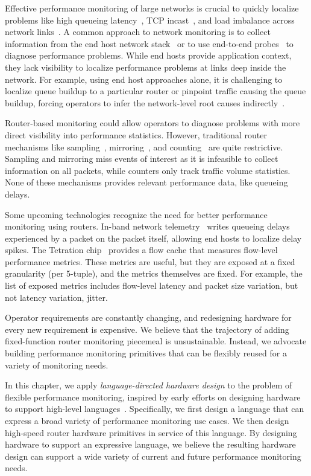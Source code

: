 Effective performance monitoring of large networks is crucial to quickly
localize problems like high queueing latency~\cite{int}, TCP
incast~\cite{tcpincast}, and load imbalance across network links~\cite{conga}.
A common approach to network monitoring is to collect information from the end
host network stack~\cite{minlan-snap, pathdump, trumpet} or to use end-to-end
probes~\cite{pingmesh} to diagnose performance problems.  While end hosts
provide application context, they lack visibility to localize performance
problems at links deep inside the network. For example, using end host
approaches alone, it is challenging to localize queue buildup to a particular
router or pinpoint traffic causing the queue buildup, forcing operators to
infer the network-level root causes indirectly~\cite{pingmesh}.

Router-based monitoring could allow operators to diagnose problems with more
direct visibility into performance statistics. However, traditional router
mechanisms like sampling~\cite{netflow, sflow}, mirroring~\cite{cisco-span,
netsight, everflow}, and counting~\cite{cormode, univmon} are quite
restrictive.  Sampling and mirroring miss events of interest as it is
infeasible to collect information on all packets, while counters only track
traffic volume statistics. None of these mechanisms provides relevant
performance data, like queueing delays.

Some upcoming technologies recognize the need for better performance monitoring
using routers. In-band network telemetry~\cite{int} writes queueing delays
experienced by a packet on the packet itself, allowing end hosts to localize
delay spikes. The Tetration chip~\cite{tetration-telemetry} provides a flow
cache that measures flow-level performance metrics.  These metrics are useful,
but they are exposed at a fixed granularity (\eg per 5-tuple), and the metrics
themselves are fixed. For example, the list of exposed metrics includes
flow-level latency and packet size variation, but not latency variation, \ie
jitter.

Operator requirements are constantly changing, and redesigning hardware for
every new requirement is expensive.  We believe that the trajectory of adding
fixed-function router monitoring piecemeal is unsustainable. Instead, we
advocate building performance monitoring primitives that can be flexibly reused
for a variety of monitoring needs.

In this chapter, we apply {\em language-directed hardware design} to the
problem of flexible performance monitoring, inspired by early efforts on
designing hardware to support high-level
languages~\cite{language-directed-computer-design, ditzel_patterson, soar}.
Specifically, we first design a language that can express a broad variety of
performance monitoring use cases. We then design high-speed router hardware
primitives in service of this language. By designing hardware to support an
expressive language, we believe the resulting hardware design can support a
wide variety of current and future performance monitoring needs.

